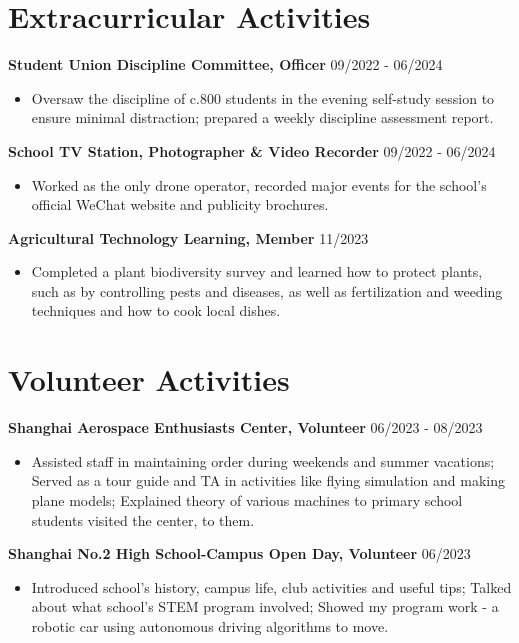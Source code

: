 \documentclass[a4paper,12pt]{article}
\begin{document}
\section{Extracurricular Activities}
\noindent \textbf{Student Union Discipline Committee, Officer} \hfill 09/2022 - 06/2024
\begin{itemize}
    \item Oversaw the discipline of c.800 students in the evening self-study session to ensure minimal distraction; prepared a weekly discipline assessment report.
\end{itemize}
\noindent \textbf{School TV Station, Photographer \& Video Recorder} \hfill 09/2022 - 06/2024
\begin{itemize}
    \item Worked as the only drone operator, recorded major events for the school's official WeChat website and publicity brochures.
\end{itemize}
\noindent \textbf{Agricultural Technology Learning, Member} \hfill 11/2023
\begin{itemize}
    \item Completed a plant biodiversity survey and learned how to protect plants, such as by controlling pests and diseases, as well as fertilization and weeding techniques and how to cook local dishes.
\end{itemize}

\section{Volunteer Activities}
\noindent \textbf{Shanghai Aerospace Enthusiasts Center, Volunteer} \hfill 06/2023 - 08/2023
\begin{itemize}
    \item Assisted staff in maintaining order during weekends and summer vacations; Served as a tour guide and TA in activities like flying simulation and making plane models; Explained theory of various machines to primary school students visited the center, to them.
\end{itemize}
\noindent \textbf{Shanghai No.2 High School-Campus Open Day, Volunteer} \hfill 06/2023
\begin{itemize}
    \item Introduced school's history, campus life, club activities and useful tips; Talked about what school's STEM program involved; Showed my program work - a robotic car using autonomous driving algorithms to move.
\end{itemize}
\end{document}
